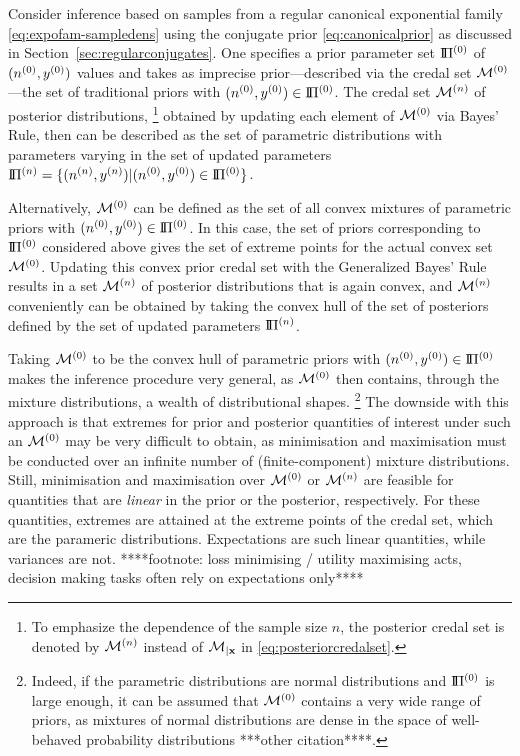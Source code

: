 Consider inference based on samples from a regular canonical exponential family \eqref{eq:expofam-sampledens}
using the conjugate prior \eqref{eq:canonicalprior} as discussed in Section~\ref{sec:regularconjugates}.
One specifies a prior parameter set $\text{I}\!\Pi^{(0)}$ of $(n^{(0)},y^{(0)})$ values
and takes as imprecise prior---described via the credal set $\mathcal{M}^{(0)}$---the set of traditional priors with $(n^{(0)}, y^{(0)}) \in \text{I}\!\Pi^{(0)}$.
The credal set $\mathcal{M}^{(n)}$ of posterior distributions,%
\footnote{To emphasize the dependence of the sample size $n$,
the posterior credal set is denoted by $\mathcal{M}^{(n)}$ instead of $\mathcal{M}_{\vert \mathbf{x}}$ in \eqref{eq:posteriorcredalset}.}
obtained by updating each element of $\mathcal{M}^{(0)}$ via Bayes' Rule,
then can be described as the set of parametric distributions
with parameters varying in the set of updated parameters $\text{I}\!\Pi^{(n)} = \{(n^{(n)},y^{(n)}) \vert (n^{(0)}, y^{(0)}) \in \text{I}\!\Pi^{(0)}\}$.

Alternatively, $\mathcal{M}^{(0)}$ can be defined as the set of all convex mixtures of parametric priors with $(n^{(0)}, y^{(0)}) \in \text{I}\!\Pi^{(0)}$.
In this case, the set of priors corresponding to $\text{I}\!\Pi^{(0)}$ considered above gives the set of extreme points for the actual convex set $\mathcal{M}^{(0)}$.
Updating this convex prior credal set with the Generalized Bayes' Rule results in a set $\mathcal{M}^{(n)}$ of posterior distributions that is again convex,
and $\mathcal{M}^{(n)}$ conveniently can be obtained by taking the convex hull of the set of posteriors
defined by the set of updated parameters $\text{I}\!\Pi^{(n)}$.

Taking $\mathcal{M}^{(0)}$ to be the convex hull of parametric priors with $(n^{(0)}, y^{(0)}) \in \text{I}\!\Pi^{(0)}$
makes the inference procedure very general,
as $\mathcal{M}^{(0)}$ then contains, through the mixture distributions, a wealth of distributional shapes.%
\footnote{Indeed, if the parametric distributions are normal distributions
and $\text{I}\!\Pi^{(0)}$ is large enough,
it can be assumed that $\mathcal{M}^{(0)}$ contains a very wide range of priors,
as mixtures of normal distributions are dense in the space of well-behaved probability distributions
\parencite[see, e.g.,][p.~44]{2000:priebe}***other citation****.}
The downside with this approach is that extremes for prior and posterior quantities of interest under such an $\mathcal{M}^{(0)}$
may be very difficult to obtain,
as minimisation and maximisation must be conducted over an infinite number of (finite-component) mixture distributions.
Still, minimisation and maximisation over $\mathcal{M}^{(0)}$ or $\mathcal{M}^{(n)}$ are feasible
for quantities that are \emph{linear} in the prior or the posterior, respectively.
For these quantities, extremes are attained at the extreme points of the credal set,
which are the parameric distributions.
Expectations are such linear quantities, while variances are not.
****footnote: loss minimising / utility maximising acts, decision making tasks often rely on expectations only****

